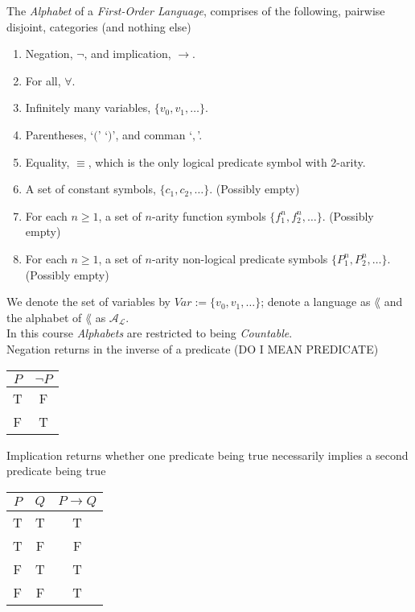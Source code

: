 \documentclass[11pt,a4paper]{article}
\begin{document}
The \textit{Alphabet} of a \textit{First-Order Language}, comprises of the following, pairwise disjoint, categories (and nothing else)
\begin{enumerate}
	\item Negation, $\neg$, and implication, $\longrightarrow$.
	\item For all, $\forall$.
	\item Infinitely many variables, $\{v_0,v_1,\dots\}$.
	\item Parentheses, `$($' `$)$', and comman `$,$'.
	\item Equality, $\equiv$, which is the only logical predicate symbol with 2-arity.
	\item A set of constant symbols, $\{c_1,c_2,\dots\}$. (Possibly empty)
	\item For each $n\geq1$, a set of $n$-arity function symbols $\{f_1^n,f_2^n,\dots\}$. (Possibly empty)
	\item For each $n\geq1$, a set of $n$-arity non-logical predicate symbols $\{P_1^n,P_2^n,\dots\}$. (Possibly empty)
\end{enumerate}
\nb We denote the set of variables by $Var:=\{v_0,v_1,\dots\}$; denote a language as $\lang$ and the alphabet of $\lang$ as $\mathcal{A_L}$.\\
\nb In this course \textit{Alphabets} are restricted to being \textit{Countable}.\\

Negation returns in the inverse of a predicate (DO I MEAN PREDICATE)
\begin{center}
\begin{tabular}{c|c}
$P$&$\neg P$\\\hline
T&F\\
F&T
\end{tabular}
\end{center}

Implication returns whether one predicate being true necessarily implies a second predicate being true
\begin{center}
\begin{tabular}{cc|c}
$P$&$Q$&$P\to Q$\\\hline
T&T&T\\
T&F&F\\
F&T&T\\
F&F&T
\end{tabular}
\end{center}
\end{document}
